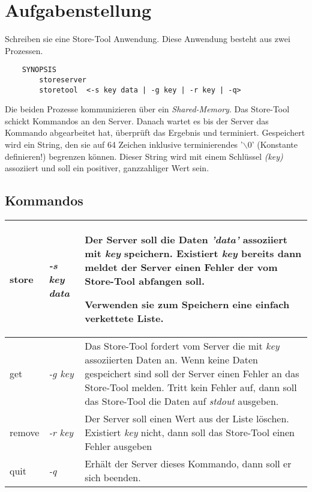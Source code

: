 




\section*{Aufgabenstellung}

Schreiben sie eine Store-Tool Anwendung. Diese Anwendung besteht aus zwei Prozessen.

\begin{verbatim}
    SYNOPSIS
        storeserver
        storetool  <-s key data | -g key | -r key | -q>
\end{verbatim}

Die beiden Prozesse kommunizieren über ein {\em Shared-Memory}. Das Store-Tool schickt Kommandos an den Server. Danach wartet es bis der Server das Kommando abgearbeitet hat, überprüft das Ergebnis und terminiert.
Gespeichert wird ein String, den sie auf 64 Zeichen inklusive terminierendes '$\backslash$0' (Konstante definieren!) begrenzen können. Dieser String wird mit einem Schlüssel \emph{(key)} assoziiert und soll ein positiver, ganzzahliger Wert sein.

\subsection*{Kommandos}
\begin{center}
\begin{tabular}{llp{10cm}}
\hline
store & \emph{-s key data} & Der Server soll die Daten \emph{'data'} assoziiert mit \emph{key} speichern. Existiert \emph{key} bereits dann meldet der Server einen Fehler der vom Store-Tool abfangen soll. 

Verwenden sie zum Speichern eine einfach verkettete Liste. \\ 
\hline
get & \emph{-g key} & Das Store-Tool fordert vom Server die mit \emph{key} assoziierten Daten an. Wenn keine Daten gespeichert sind soll der Server einen Fehler an das Store-Tool melden. Tritt kein Fehler auf, dann soll das Store-Tool die Daten auf \emph{stdout} ausgeben. \\
\hline
remove & \emph{-r key} & Der Server soll einen Wert aus der Liste löschen. Existiert \emph{key} nicht, dann soll das Store-Tool einen Fehler ausgeben \\
\hline
quit & \emph{-q} & Erhält der Server dieses Kommando, dann soll er sich beenden. \\
\hline
\end{tabular}
\end{center}
 
